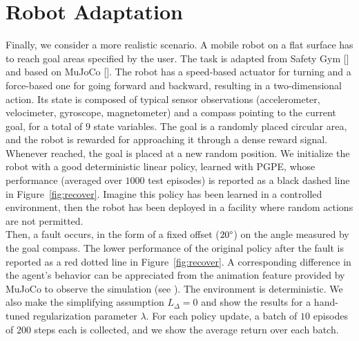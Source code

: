 \section{Robot Adaptation} \label{sec:safe}
Finally, we consider a more realistic scenario. A mobile robot on a flat surface has to reach goal areas specified by the user. 
The task is adapted from Safety Gym [\cite{ray2019benchmarking}] and based on MuJoCo [\cite{todorov2012mujoco}]. The robot has a speed-based actuator for turning and a force-based one for going forward and backward, resulting in a two-dimensional action. Its state is composed of typical sensor observations (accelerometer, velocimeter, gyroscope, magnetometer) and a compass pointing to the current goal, for a total of $9$ state variables. The goal is a randomly placed circular area, and the robot is rewarded for approaching it through a dense reward signal. Whenever reached, the goal is placed at a new random position. We initialize the robot with a good deterministic linear policy, learned with \ac{PGPE}, whose performance (averaged over $1000$ test episodes) is reported as a black dashed line in Figure~\ref{fig:recover}. Imagine this policy has been learned in a controlled environment, then the robot has been deployed in a facility where random actions are not permitted.\\
\newline
Then, a fault occurs, in the form of a fixed offset ($20\degree$) on the angle measured by the goal compass. The lower performance of the original policy after the fault is reported as a red dotted line in Figure~\ref{fig:recover}. A corresponding difference in the agent's behavior can be appreciated from the animation feature provided by MuJoCo to observe the simulation (see ). The environment is deterministic. We also make the simplifying assumption $L_{\Delta}=0$ and show the results for a hand-tuned regularization parameter $\lambda$. For each policy update, a batch of $10$ episodes of $200$ steps each is collected, and we show the average return over each batch.

